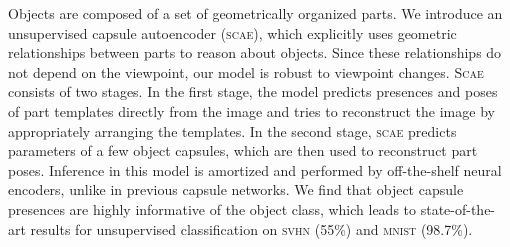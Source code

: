 % 
% 
Objects are composed of a set of geometrically organized parts. We introduce an unsupervised capsule autoencoder (\textsc{scae}), which explicitly uses geometric relationships between parts to reason about objects.
 Since these relationships do not depend on the viewpoint, our model is robust to viewpoint changes.
\textsc{Scae} consists of two stages.
In the first stage, the model predicts presences and poses of part templates directly from the image and tries to reconstruct the image by appropriately arranging the templates.
In the second stage, \textsc{scae} predicts parameters of a few object capsules, which are then used to reconstruct part poses.
Inference in this model is amortized and performed by off-the-shelf neural encoders, unlike in previous capsule networks.
We find that object capsule presences are highly informative of the object class, which leads to state-of-the-art results for unsupervised classification on \textsc{svhn} (55\%) and \textsc{mnist} (98.7\%).
